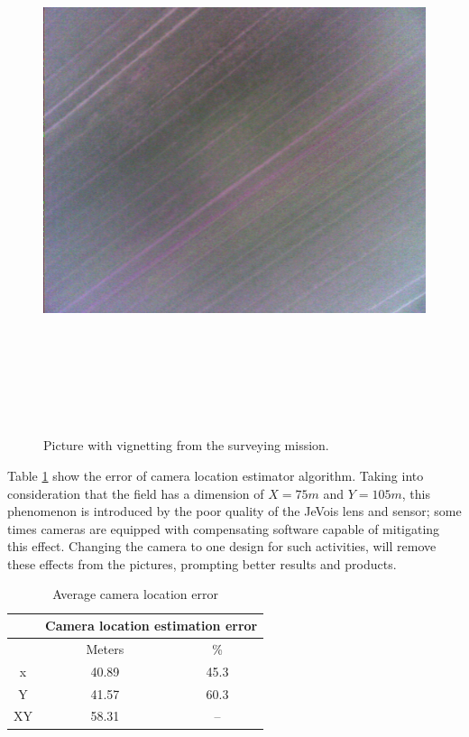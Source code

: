 \begin{figure}[H]
\centering
\includegraphics[width=16cm,height=16cm,keepaspectratio]{imagenes/IMG_62.png}
\caption{Picture with vignetting from the surveying mission.}
\label{fig:vignetting}
\end{figure}
Table \ref{Talbe:XYerror} show the error of camera location estimator algorithm. Taking into consideration that the field has a dimension of $X = 75 m$ and $ Y = 105 m$,  this phenomenon is introduced by the poor quality of the JeVois lens and sensor; some times cameras are equipped with compensating software capable of mitigating this effect. Changing the camera to one design for such activities, will remove these effects from the pictures, prompting better results and products.
\begin{table}[H]
\centering
\begin{tabular}{|c|c|c|}
\hline
   & \multicolumn{2}{c|}{Camera location estimation error} \\ \hline
   & Meters                     & \%                       \\ \hline
x  & 40.89                      & 45.3                     \\ \hline
Y  & 41.57                      & 60.3                     \\ \hline
XY & 58.31                      & --                       \\ \hline
\end{tabular}
\caption{Average camera location error}
\label{Talbe:XYerror}
\end{table}